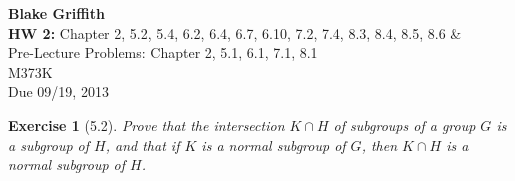 \documentclass[12pt,leqno]{article}
\numberwithin{equation}{section}
\newtheorem*{exer}{Exercise}
\theoremstyle{definition}
\begin{document}
\thispagestyle{plain}
\begin{flushright}
\large{\textbf{Blake Griffith \\}
\textbf{HW 2:} Chapter 2, 5.2, 5.4, 6.2, 6.4, 6.7, 6.10, 7.2, 7.4, 8.3, 8.4, 8.5, 8.6  \& \\
Pre-Lecture Problems: Chapter 2, 5.1, 6.1, 7.1, 8.1\\
M373K \\
Due 09/19, 2013 \\}
\end{flushright}

\markboth{}{} \setcounter{section}{0} \baselineskip=18pt

\setcounter{tocdepth}{4}


\begin{exer}[5.2]
Prove that the intersection $K \cap H $ of subgroups of a group $G$ is a subgroup of $H$, and that if $K$ is a normal subgroup of $G$, then $K \cap H$ is a normal subgroup of $H$.  
\end{exer}
\end{document}
